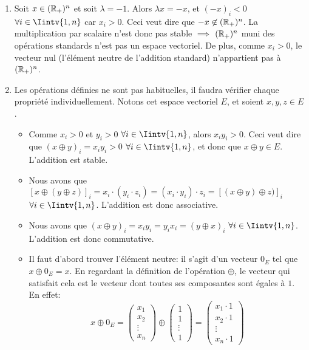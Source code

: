\begin{exercice}
\begin{enumerate}
    \item Soit $x \in (\mathbb{R}_+)^n$ et soit $\lambda = -1$. Alors $\lambda x = -x$, et $(-x)_i < 0$ $\forall i \in \Iintv{1,n}$ car $x_i > 0$. Ceci veut dire que $-x \not\in (\mathbb{R}_+)^n$. La multiplication par scalaire n'est donc pas stable $\implies$ $(\mathbb{R}_+)^n$ muni des opérations standards n'est pas un espace vectoriel. De plus, comme $x_i > 0$, le vecteur nul (l'élément neutre de l'addition standard) n'appartient pas à $(\mathbb{R}_+)^n$.
    
    \item Les opérations définies ne sont pas habituelles, il faudra vérifier chaque propriété individuellement. Notons cet espace vectoriel $E$, et soient $x,y,z \in E$. 
    \begin{itemize}
        \item Comme $x_i > 0$ et $y_i > 0$ $\forall i \in \Iintv{1,n}$, alors $x_i y_i > 0$. Ceci veut dire que $(x \oplus y)_i = x_i y_i > 0$ $\forall i \in \Iintv{1,n}$, et donc que $x \oplus y \in E$. L'addition est stable.
        \item Nous avons que $[x \oplus (y \oplus z)]_i = x_i \cdot (y_i \cdot z_i) = (x_i \cdot y_i) \cdot z_i = [(x \oplus y) \oplus z)]_i$ $\forall i \in \Iintv{1,n}$. L'addition est donc associative.
        \item Nous avons que $(x\oplus y)_i = x_i y_i = y_i x_i = (y \oplus x)_i$ $\forall i \in \Iintv{1,n}$. L'addition est donc commutative.
        \item Il faut d'abord trouver l'élément neutre: il s'agit d'un vecteur $0_E$ tel que $x \oplus 0_E = x$. En regardant la définition de l'opération $\oplus$, le vecteur qui satisfait cela est le vecteur dont toutes ses composantes sont égales à $1$. En effet:
        $$x \oplus 0_E = \begin{pmatrix}
            x_1 \\ x_2 \\ \vdots \\ x_n
        \end{pmatrix} \oplus 
        \begin{pmatrix}
            1 \\ 1 \\ \vdots \\ 1
        \end{pmatrix} =
        \begin{pmatrix}
            x_1 \cdot 1 \\ x_2 \cdot 1 \\ \vdots \\ x_n \cdot 1

\end{pmatrix}$$
\end{itemize}
\end{enumerate}
\end{exercice}
